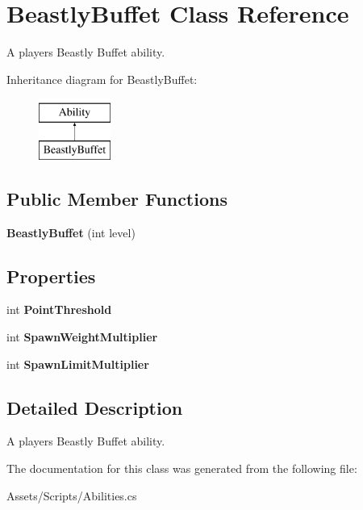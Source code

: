 \hypertarget{class_beastly_buffet}{}\section{Beastly\+Buffet Class Reference}
\label{class_beastly_buffet}


A player\textquotesingle{}s Beastly Buffet ability.  


Inheritance diagram for Beastly\+Buffet\+:\begin{figure}[H]
\begin{center}
\leavevmode
\includegraphics[height=2.000000cm]{class_beastly_buffet}
\end{center}
\end{figure}
\subsection*{Public Member Functions}
\begin{DoxyCompactItemize}
\item 
{\bfseries Beastly\+Buffet} (int level)\hypertarget{class_beastly_buffet_a6e387536d0792b607afd11009c8c8f84}{}\label{class_beastly_buffet_a6e387536d0792b607afd11009c8c8f84}

\end{DoxyCompactItemize}
\subsection*{Properties}
\begin{DoxyCompactItemize}
\item 
int {\bfseries Point\+Threshold}\hypertarget{class_beastly_buffet_afed4bafd87f66cbfa274754c42d36432}{}\label{class_beastly_buffet_afed4bafd87f66cbfa274754c42d36432}

\item 
int {\bfseries Spawn\+Weight\+Multiplier}\hypertarget{class_beastly_buffet_a7699500e2165dcb6c1a477e27000586e}{}\label{class_beastly_buffet_a7699500e2165dcb6c1a477e27000586e}

\item 
int {\bfseries Spawn\+Limit\+Multiplier}\hypertarget{class_beastly_buffet_abe3dfe823e7bb4fa09589b04f4dedd4b}{}\label{class_beastly_buffet_abe3dfe823e7bb4fa09589b04f4dedd4b}

\end{DoxyCompactItemize}


\subsection{Detailed Description}
A player\textquotesingle{}s Beastly Buffet ability. 



The documentation for this class was generated from the following file\+:\begin{DoxyCompactItemize}
\item 
Assets/\+Scripts/Abilities.\+cs\end{DoxyCompactItemize}
